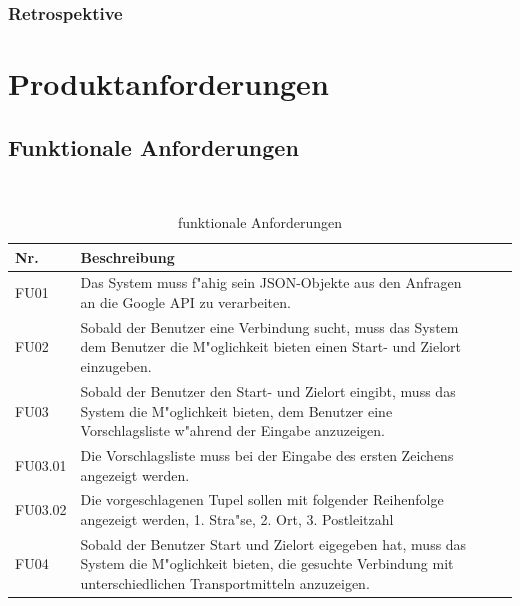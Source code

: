 \documentclass[a4paper, 11pt]{scrreprt}
\begin{document}
\subsection{Retrospektive}

\chapter{Produktanforderungen}

\section{Funktionale Anforderungen}

\begin{table}[H]

\caption{funktionale Anforderungen}

\ \\

\par

\label{tab:Tabelle1}

\centering

\begin{tabular}{|p{2.5cm} p{12cm}| ll}

\hline

Nr.	& Beschreibung\\

\hline

FU01 &	Das System muss f"ahig sein JSON-Objekte aus den Anfragen an die Google API zu verarbeiten.\\

\hline
FU02 &	Sobald der Benutzer eine Verbindung sucht, muss das System dem Benutzer die M"oglichkeit bieten einen Start- und Zielort einzugeben.\\

\hline
FU03& Sobald der Benutzer den Start- und Zielort eingibt, muss das System die M"oglichkeit bieten, dem Benutzer eine Vorschlagsliste w"ahrend der Eingabe anzuzeigen.\\

\hline
FU03.01	&Die Vorschlagsliste muss bei der Eingabe des ersten Zeichens angezeigt werden.\\

\hline
FU03.02	&Die vorgeschlagenen Tupel sollen mit folgender Reihenfolge angezeigt werden, 1. Stra"se, 2. Ort, 3. Postleitzahl\\

\hline
FU04	&Sobald der Benutzer Start und Zielort eigegeben hat, muss das System die M"oglichkeit bieten, die gesuchte Verbindung mit unterschiedlichen Transportmitteln anzuzeigen.\\


\end{tabular}
\end{table}
\end{document}
